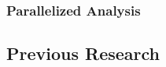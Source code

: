 \subsubsection{Parallelized Analysis}

\subsection{Previous Research}
\subsubsection{\libdft}
\subsubsection{\tfa}
\subsubsection{\sreplica}
